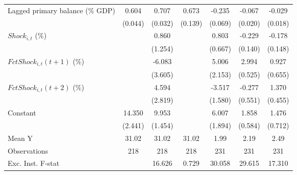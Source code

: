 {\begin{tabular}{l*{6}{c}}
\addlinespace
Lagged primary balance (\% GDP)&       0.604\sym{***}&       0.707\sym{***}&       0.673\sym{***}&      -0.235\sym{***}&      -0.067\sym{***}&      -0.029         \\
                    &     (0.044)         &     (0.032)         &     (0.139)         &     (0.069)         &     (0.020)         &     (0.018)         \\
\addlinespace
$ Shock_{i,t}$ (\%) &                     &       0.860         &                     &       0.803         &      -0.229         &      -0.178         \\
                    &                     &     (1.254)         &                     &     (0.667)         &     (0.140)         &     (0.148)         \\
\addlinespace
$ FctShock_{i,t}(t+1)$ (\%)&                     &      -6.083         &                     &       5.006\sym{**} &       2.994\sym{***}&       0.927         \\
                    &                     &     (3.605)         &                     &     (2.153)         &     (0.525)         &     (0.655)         \\
\addlinespace
$ FctShock_{i,t}(t+2)$ (\%)&                     &       4.594         &                     &      -3.517\sym{**} &      -0.277         &       1.370\sym{**} \\
                    &                     &     (2.819)         &                     &     (1.580)         &     (0.551)         &     (0.455)         \\
\addlinespace
Constant            &      14.350\sym{***}&       9.953\sym{***}&                     &       6.007\sym{***}&       1.858\sym{***}&       1.476\sym{*}  \\
                    &     (2.441)         &     (1.454)         &                     &     (1.894)         &     (0.584)         &     (0.712)         \\
\midrule
Mean Y              &       31.02         &       31.02         &       31.02         &        1.99         &        2.19         &        2.49         \\
Observations        &         218         &         218         &         218         &         231         &         231         &         231         \\
Exc. Inst. F-stat   &                     &      16.626         &       0.729         &      30.058         &      29.615         &      17.310         \\
\bottomrule
\end{tabular}
}

